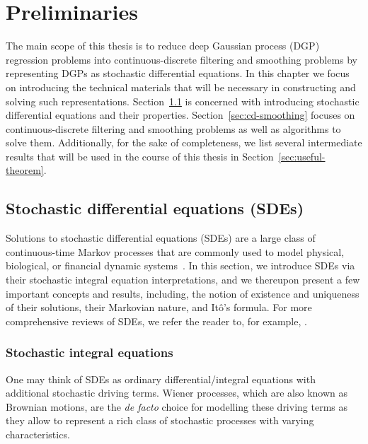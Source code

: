 \chapter{Preliminaries}
\label{chap:cd-smoothing}
The main scope of this thesis is to reduce deep Gaussian process (DGP) regression problems into continuous-discrete filtering and smoothing problems by representing DGPs as stochastic differential equations. In this chapter we focus on introducing the technical materials that will be necessary in constructing and solving such representations. Section~\ref{sec:sde} is concerned with introducing stochastic differential equations and their properties. Section~\ref{sec:cd-smoothing} focuses on continuous-discrete filtering and smoothing problems as well as algorithms to solve them. Additionally, for the sake of completeness, we list several intermediate results that will be used in the course of this thesis in Section~\ref{sec:useful-theorem}.

\section{Stochastic differential equations (SDEs)}
\label{sec:sde}
Solutions to stochastic differential equations (SDEs) are a large class of continuous-time Markov processes that are commonly used to model physical, biological, or financial dynamic systems~\citep{Kloeden1992, Braumann2019}. In this section, we introduce SDEs via their stochastic integral equation interpretations, and we thereupon present a few important concepts and results, including, the notion of existence and uniqueness of their solutions, their Markovian nature, and It\^{o}'s formula. For more comprehensive reviews of SDEs, we refer the reader to, for example, \citet{Chung1990, Karatzas1991, Ikeda1992, Oksendal2003}.

\subsection{Stochastic integral equations}
One may think of SDEs as ordinary differential/integral equations with additional stochastic driving terms. Wiener processes, which are also known as Brownian motions, are the \textit{de facto} choice for modelling these driving terms as they allow to represent a rich class of stochastic processes with varying characteristics. 

